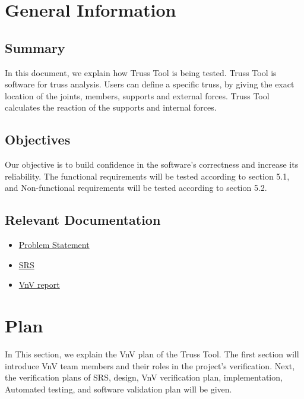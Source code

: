 \documentclass[12pt, titlepage]{article}
\begin{document}
\section{General Information}


\subsection{Summary}

In this document, we explain how Truss Tool is being tested. Truss Tool is software for truss analysis. Users can define a specific truss, by giving the exact location of the joints, members, supports and external forces.  Truss Tool calculates the reaction of the supports and internal forces. 

\subsection{Objectives}

Our objective is to build confidence in the software's correctness and increase its reliability. The functional requirements will be tested according to section 5.1, and Non-functional requirements will be tested according to section 5.2.

\subsection{Relevant Documentation}
\begin{itemize}
	\item 
	\href{https://github.com/Maryamvalian/project741/blob/main/docs/ProblemStatementAndGoals/ProblemStatement.pdf}{Problem
	 Statement}
	\item 
	\href{https://github.com/Maryamvalian/project741/blob/main/docs/SRS/SRS.pdf}{SRS} 
	\item \href{https://github.com/Maryamvalian/project741/blob/main/docs/VnVReport/VnVReport.pdf}{VnV
	 report}
\end{itemize}

\section{Plan}
In This section, we explain the VnV plan of the Truss Tool. The first section will introduce VnV team members and their roles in the project's verification. Next, the verification plans of SRS, design, VnV verification plan, implementation, Automated testing, and software validation plan will be given. 
\end{document}
